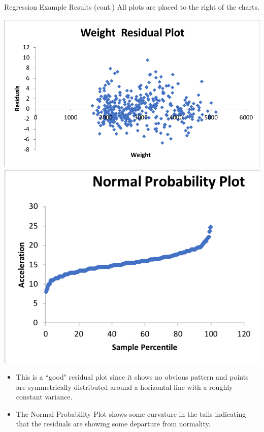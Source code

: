 \documentclass[xcolor=svgnames]{beamer}
\begin{document}
\begin{frame}[label=current]{Regression Example Results (cont.)}
 All plots are placed to the right of the charts.\\ 
\begin{center}
\includegraphics[height=.4\textheight]{RER2}\includegraphics[height=.4\textheight]{normalpp}
\end{center}
\begin{itemize}
\item This is a ``good" residual plot since it shows no obvious pattern and  points are  symmetrically distributed  around a horizontal line with a roughly constant variance.
\item The Normal Probability Plot shows some curvature in the tails indicating that the residuals are showing some departure from normality. 
\end{itemize}
\end{frame}
\end{document}
